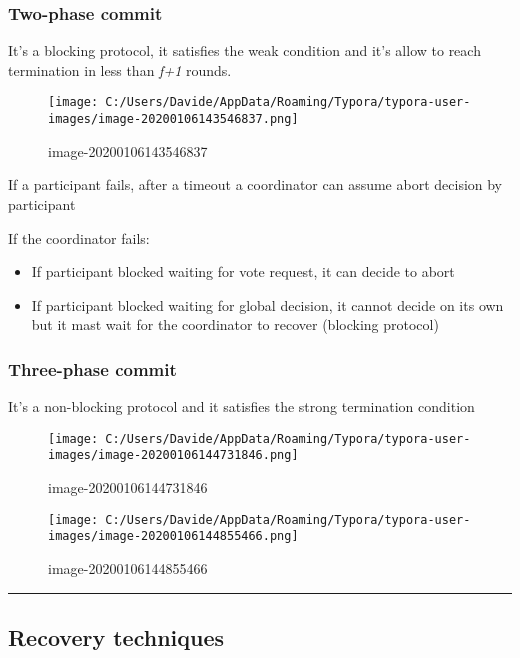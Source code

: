 \subsubsection{Two-phase commit}\label{two-phase-commit}

It's a blocking protocol, it satisfies the weak condition and it's allow
to reach termination in less than \emph{f+1} rounds.

\begin{figure}[htbp]
\centering
\texttt{[image: C:/Users/Davide/AppData/Roaming/Typora/typora-user-images/image-20200106143546837.png]}
\caption{image-20200106143546837}
\end{figure}

If a participant fails, after a timeout a coordinator can assume abort
decision by participant

If the coordinator fails:

\begin{itemize}
\itemsep1pt\parskip0pt
\item
  If participant blocked waiting for vote request, it can decide to
  abort
\item
  If participant blocked waiting for global decision, it cannot decide
  on its own but it mast wait for the coordinator to recover (blocking
  protocol)
\end{itemize}

\subsubsection{Three-phase commit}\label{three-phase-commit}

It's a non-blocking protocol and it satisfies the strong termination
condition

\begin{figure}[htbp]
\centering
\texttt{[image: C:/Users/Davide/AppData/Roaming/Typora/typora-user-images/image-20200106144731846.png]}
\caption{image-20200106144731846}
\end{figure}

\begin{figure}[htbp]
\centering
\texttt{[image: C:/Users/Davide/AppData/Roaming/Typora/typora-user-images/image-20200106144855466.png]}
\caption{image-20200106144855466}
\end{figure}

\begin{center}\rule{3in}{0.4pt}\end{center}

\subsection{Recovery techniques}\label{recovery-techniques}

